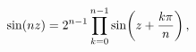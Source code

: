 \[\mathop{\sin\/}\nolimits\!\left(nz\right)=2^{n-1}\prod_{k=0}^{n-1}\mathop{\sin%
\/}\nolimits\!\left(z+\frac{k\pi}{n}\right),\]
